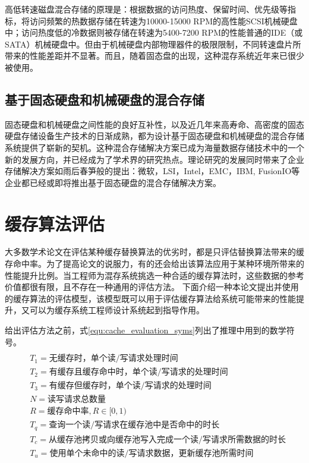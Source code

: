 高低转速磁盘混合存储的原理是：根据数据的访问热度、保留时间、优先级等指标，将访问频繁的热数据存储在转速为10000-15000 RPM的高性能SCSI机械硬盘中；访问热度低的冷数据则被存储在转速为5400-7200 RPM的性能普通的IDE（或SATA）机械硬盘中。但由于机械硬盘内部物理器件的极限限制，不同转速盘片所带来的性能差距并不显著。而且，随着固态盘的出现，这种混存系统近年来已很少被使用。

\subsection{基于固态硬盘和机械硬盘的混合存储}

固态硬盘和机械硬盘之间性能的良好互补性，以及近几年来高寿命、高密度的固态硬盘存储设备生产技术的日渐成熟，都为设计基于固态硬盘和机械硬盘的混合存储系统提供了崭新的契机。这种混合存储解决方案已成为海量数据存储技术中的一个新的发展方向，并已经成为了学术界的研究热点。理论研究的发展同时带来了企业存储解决方案如雨后春笋般的提出：微软，LSI，Intel，EMC，IBM, FusionIO等企业都已经或即将推出基于固态硬盘的混合存储解决方案。

\section{缓存算法评估}
\label{sec:cache_evaluation}

大多数学术论文在评估某种缓存替换算法的优劣时，都是只评估替换算法带来的缓存命中率。为了提高论文的说服力，有的还会给出该算法应用于某种环境所带来的性能提升比例。当工程师为混存系统挑选一种合适的缓存算法时，这些数据的参考价值都很有限，且不存在一种通用的评估方法。
下面介绍一种本论文提出并使用的缓存算法的评估模型，该模型既可以用于评估缓存算法给系统可能带来的性能提升，又可以为缓存系统工程师设计系统起到指导作用。

给出评估方法之前，式\ref{equ:cache_evaluation_syms}列出了推理中用到的数学符号。
\begin{equation}
\begin{split}
\\&T_1=\mbox{无缓存时，单个读/写请求处理时间}
\\&T_2=\mbox{有缓存且缓存命中时，单个读/写请求的处理时间}
\\&T_3=\mbox{有缓存但缓存时，单个读/写请求的处理时间}
\\&N=\mbox{读写请求总数量}
\\&R=\mbox{缓存命中率},R\in\lbrack0,1)
\\&T_q=\mbox{查询一个读/写请求在缓存池中是否命中的时长}
\\&T_c=\mbox{从缓存池拷贝或向缓存池写入完成一个读/写请求所需数据的时长}
\\&T_u=\mbox{使用单个未命中的读/写请求数据，更新缓存池所需时间}
\end{split}
\label{equ:cache_evaluation_syms}
\end{equation}

